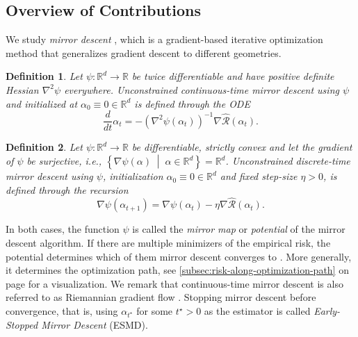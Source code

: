 \documentclass[a4paper]{article}
\newcommand{\mathset}[1]{\left\{#1\right\}}
\newcommand{\pr}[1]{\left(#1\right)}
\newcommand{\setmid}[0]{\;\middle|\;}
\newcommand{\RR}[0]{\mathbb{R}}
\newcommand{\cR}[0]{\mathcal{R}}
\newcommand{\tstar}{t^\star}
\newcommand{\alphat}[0]{\alpha_t}
\newcommand{\alphatstar}[0]{\alpha_{t^\star}}
\newcommand{\Rhat}[0]{\widehat{\cR}}
\theoremstyle{thmstyle}
\theoremstyle{defstyle}
\newtheorem{definition}{Definition}
\theoremstyle{remark}
\begin{document}
\subsection{Overview of Contributions}
\label{subsec:contributions}

We study \emph{mirror descent} \citep{Nemirovski1983}, which is a gradient-based iterative optimization method that generalizes gradient descent to different geometries.
\begin{definition}
\label{def:continuous-mirror-descent}
    Let $\psi:\RR^d\to \RR$ be twice differentiable and have positive definite Hessian $\nabla^2\psi$ everywhere. 
    Unconstrained \emph{continuous-time} \emph{mirror descent} using $\psi$ and initialized at $\alpha_0\equiv 0\in\RR^d$ is defined through the ODE
    \begin{equation}
        \label{eq:continuous-mirror-descent-definition}
        \frac{d}{dt}\alphat = -\pr{\nabla^2\psi(\alphat)}^{-1}\nabla \Rhat(\alphat).
    \end{equation}
\end{definition}
\begin{definition}
\label{def:discrete-mirror-descent}
Let $\psi:\RR^d\to \RR$ be  differentiable, strictly convex and let the gradient of $\psi$ be surjective, i.e., $\mathset{\nabla\psi(\alpha)\setmid \alpha\in\RR^d}=\RR^d$. 
Unconstrained \emph{discrete-time mirror descent} using $\psi$, initialization $\alpha_0\equiv 0\in\RR^d$ and fixed step-size $\eta>0$, is defined through the recursion
\begin{equation}
\label{eq:discrete-mirror-descent-definition}
    \nabla\psi (\alpha_{t+1})=\nabla\psi(\alphat)-\eta \nabla \Rhat(\alphat).
\end{equation}
\end{definition}
\noindent In both cases, the function $\psi$ is called the \emph{mirror map} or \emph{potential} of the mirror descent algorithm. If there are multiple minimizers of the empirical risk, the potential determines which of them mirror descent converges to \citep{Gunasekar2018}. More generally, it determines the optimization path, see \cref{subsec:risk-along-optimization-path} on page \pageref{subsec:risk-along-optimization-path} for a visualization.
We remark that continuous-time mirror descent is also referred to as Riemannian gradient flow \citep{Gunasekar2021mirrorless}. Stopping mirror descent before convergence, that is, using $\alphatstar$ for some $\tstar>0$ as the estimator is called \emph{Early-Stopped Mirror Descent} (ESMD).
\end{document}
